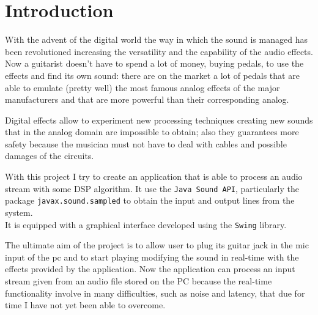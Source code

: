 \chapter{Introduction}

With the advent of the digital world the way in which the sound is
managed has been revolutioned increasing the versatility and the
capability of the audio effects.
Now a guitarist doesn't have to spend a lot of money, buying pedals, to
use the effects and find its own sound: there are on
the market a lot of pedals that are able to emulate (pretty well) the
most famous analog effects of the major manufacturers and that are more
powerful than their corresponding analog.


Digital
effects allow to experiment new processing techniques creating new
sounds that in the analog domain are impossible to obtain; also they
guarantees more safety because the musician must not have to deal with
cables and possible damages of the circuits.

\vspace{0.2in}
With this project I try to create an application that is able to process
an audio stream with some DSP algorithm. It use the
\texttt{Java Sound API}\cite{javasound}, particularly the package
\texttt{javax.sound.sampled} to obtain the input and output lines from
the system.\\
It is equipped with a graphical interface developed using the \texttt{Swing}
library.

\vspace{0.2in}
The ultimate aim of the project is to allow user to plug its guitar jack
in the mic input of the pc and to start playing modifying the sound in
real-time with the effects provided by the application. Now the
application can process an input stream given from an audio file stored
on the PC because the real-time functionality involve in many
difficulties, such as noise and latency, that due for time I have not
yet been able to overcome. 
